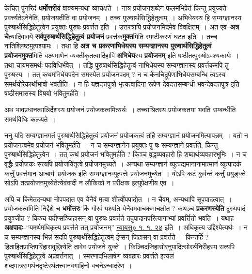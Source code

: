 \documentclass[article,12pt,a4paper]{memoir}
\begin{document}
	  \pstart केचित् पुनरिदं \textbf{धर्मोत्तरीयं} वाक्यमन्यथा व्याचक्षते । नात्र प्रयोजनशब्देन फलमभिप्रेतं किन्तु प्रयुज्यते प्रवर्त्त्यतेऽनेनेति, प्रयोजयतीति वा प्रयोजनम् । तच्च पुरुषार्थसिद्धिहेतुत्वम् । अभिधेयस्य हि सम्यग्ज्ञानस्य पुरुषार्थसिद्धिहेतुत्वेन प्रयुक्तः पुरुषः प्रवर्त्तत इति । उत्तरत्रापि प्रयोजनमिदमेव विवक्षितम् । अत एव--\textbf{अत्र चे}त्यादिवाक्ये \textbf{सर्वपुरुषार्थसिद्धिहेतुत्वं प्रयोजनं} प्रवर्त्तक\textbf{मुक्त}मिति स्पष्टीकरणं घटत इति । तच्च नातिश्लिष्टमुत्पश्यामः । तथा हि \textbf{अत्र च प्रकरणाभिधेयस्य सम्यग्ज्ञानस्य पुरुषार्थसिद्धिहेतुत्वं प्रयोजनमुक्त}मिति वक्ष्यमाणेन व्यक्तीकृतत्वादिहापि \textbf{अभिधेय}स्य \textbf{प्रयोजनम्} इति षष्ठीतत्पुरुषोऽवश्यकार्यः । तथा चायमसमर्थः पदविधिर्भवेत् । तद्धि पुरुषार्थसिद्धिहेतुत्वं नाभिधेयस्य सम्यग्ज्ञानस्य प्रवर्त्तकमपि तु पुरुषस्य । तत् कथमभिधेयपदेन समस्येत प्रयोजनपदम् ? न च केनचिद्रूपेणाभिधेयसम्बन्धि  \leavevmode{} त्वऽस्य समर्थयोरेकार्थीभावो भवतीति । न हि यज्ञदत्तपुत्रो भृत्यत्वादिना रूपेण देवदत्तसम्बन्धी भवन्देवदत्तपुत्र इति षष्ठीसमासस्य विषयो भवितुमर्हति ।
	\pend
      

	  \pstart अथ भावप्रधानत्वान्निर्देशस्य प्रयोजनं प्रयोजकत्वमित्यर्थः । तच्चाश्रितस्य प्रयोजकतया भवति सम्बन्धीति समर्थविधिः कल्प्यते ।
	\pend
      

	  \pstart ननु यदि सम्यग्ज्ञानगतं पुरुषार्थसिद्धिहेतुत्वं प्रयोजनं प्रयोजकत्वं तर्हि सम्यग्ज्ञानं प्रयोजनमित्यापन्नम् । यतो न प्रयोजनत्वमेव प्रयोजनं भवितुमर्हति । न च सम्यग्ज्ञानेन प्रयुक्तः पु षः सम्यग्ज्ञाने प्रवर्त्तते, किन्तु पुरुषार्थसिद्धिहेतुत्वेन । तत् कथं प्रयोजनं भवितुमर्हति ? किञ्च वृद्धव्यवहारो हि शब्दार्थव्यवहारभूमिः । न च वृद्धैः प्रयोजकः सत्यपि प्रयोजयितृत्वे प्रयोजनमुच्यते । अन्यथा सम्यग्ज्ञानं व्युत्पद्यमानानामात्मानं व्युत्पादकं कर्त्तुं प्रवर्त्तमान आचार्यः प्रयोजक इति सम्यग्ज्ञानव्युत्पत्तेः प्रयोजनमुच्येत । योऽपि कटं कुर्वन्तं कर्त्तुं प्रयुङ्क्ते सोऽपि तत्प्रयोजनमुच्येतेत्येवंवादी न लौकिको न परीक्षक इत्युपेक्षणीय एव ।
	\pend
      

	  \pstart अपि च किमेतदन्यथा नोपपद्यत एव येनैवं मृत्वा शीर्त्वोपपाद्येत । न चैवम्, अन्यथापि सूपपादत्वात् । प्रयोजकत्वमिति निर्द्देशे च \textbf{धर्मोत्तरः} किं गौरवं पश्यति येनैवमवाचकमाचक्षीत ? कथञ्च \textbf{प्रकरणस्येति} दुरुपपादं प्रयुञ्जीत ? किञ्च यदीप्सञ्जिहासन् वा पुरुषः प्रवर्त्तते तदुपादानपरित्यागाभ्यां प्रवर्त्तितो भवति । यथाह \textbf{अक्षपादः}--“यमर्थमधिकृत्य प्रवर्त्तते तत् प्रयोजनम्” \href{http://http://sarit.indology.info/?cref=ns.1.1.24}{न्यायसू० १. १. २४} इति । अधिकृत्य उद्दिश्येत्यर्थः । न च सम्यग्ज्ञानस्य भिन्नं सदपि पुरुषार्थसिद्धिहेतुत्वम् ईप्सन् जिहासन् वा प्रवर्त्तते । किन्तर्हि ? हिताहितप्राप्तिपरिहारावुद्दिश्येति तावेव प्रयोजने युक्ते । किञ्चिदजिहासोरनुपादित्सोरर्थनिरीह\leavevmode{}स्य सत्यपि पुरुषार्थसिद्धिहेतुत्वे अप्रवर्त्तनात् । स्मरणादभिलाषेण व्यवहारः प्रवर्त्तते इत्यलं शब्दमात्रसमर्थनदृष्टेरर्थतत्त्वानवगाहिनो वचनेऽन्धादरेण ।
	\pend
      
\end{document}
